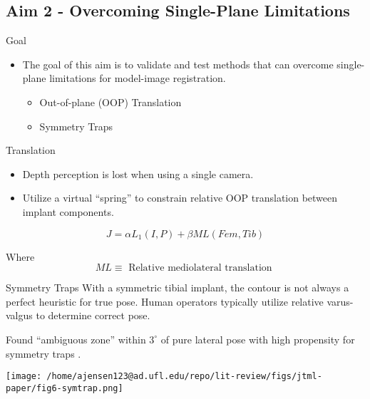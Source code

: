 \documentclass[presentation, aspectratio=1610]{beamer}
\begin{document}
\subsection{Aim 2 - Overcoming Single-Plane Limitations}
\label{sec:orgce7d90a}
\begin{frame}[label={sec:org480ef44}]{Goal}
\begin{itemize}
\item The goal of this aim is to validate and test methods that can overcome single-plane limitations for model-image registration.
\begin{itemize}
\item Out-of-plane (OOP) Translation
\item Symmetry Traps
\end{itemize}
\end{itemize}
\end{frame}
\begin{frame}[label={sec:org05c7add}]{Translation}
\begin{itemize}
\item Depth perception is lost when using a single camera.
\item Utilize a virtual ``spring'' to constrain relative OOP translation between implant components.
\end{itemize}

\begin{equation*}
  J = \alpha L_{1}(I,P) + \beta ML(Fem,Tib)
\end{equation*}

Where
\begin{equation*}
  ML \equiv \text{ Relative mediolateral translation }
\end{equation*}
\end{frame}
\begin{frame}[label={sec:org64c8ed1}]{Symmetry Traps}
With a symmetric tibial implant, the contour is not always a perfect heuristic for true pose. Human operators typically utilize relative varus-valgus to determine correct pose.

Found ``ambiguous zone'' within \(3^{\circ}\) of pure lateral pose with high propensity for symmetry traps \autocite{jensenJointTrackMachine2022}.

\begin{center}
\texttt{[image: /home/ajensen123@ad.ufl.edu/repo/lit-review/figs/jtml-paper/fig6-symtrap.png]}
\end{center}
\end{frame}
\end{document}
